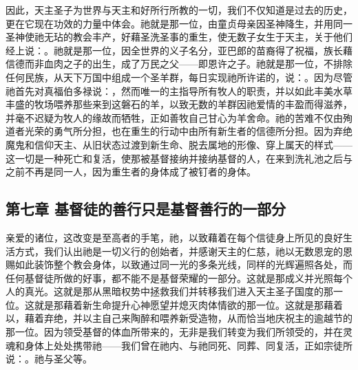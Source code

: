 因此，天主圣子为世界与天主和好所行所教的一切，我们不仅知道是过去的历史，更在它现在功效的力量中体会。祂就是那一位，由童贞母亲因圣神降生，并用同一圣神使祂无玷的教会丰产，好藉圣洗圣事的重生，使无数子女生于天主，关于他们经上说：。祂就是那一位，因全世界的义子名分，亚巴郎的苗裔得了祝福，族长藉信德而非血肉之子的出生，成了万民之父——即恩许之子。祂就是那一位，不排除任何民族，从天下万国中组成一个圣羊群，每日实现祂所许诺的，说：。因为尽管祂首先对真福伯多禄说：，然而唯一的主指导所有牧人的职责，并以如此丰美水草丰盛的牧场喂养那些来到这磐石的羊，以致无数的羊群因祂爱情的丰盈而得滋养，并毫不迟疑为牧人的缘故而牺牲，正如善牧自己甘心为羊舍命。祂的苦难不仅由殉道者光荣的勇气所分担，也在重生的行动中由所有新生者的信德所分担。因为弃绝魔鬼和信仰天主、从旧状态过渡到新生命、脱去属地的形像、穿上属天的样式——这一切是一种死亡和复活，使那被基督接纳并接纳基督的人，在来到洗礼池之后与之前不再是同一人，因为重生者的身体成了被钉者的身体。\par


\subsection{第七章 基督徒的善行只是基督善行的一部分}

亲爱的诸位，这改变是至高者的手笔，祂，以致藉着在每个信徒身上所见的良好生活方式，我们认出祂是一切义行的创始者，并感谢天主的仁慈，祂以无数恩宠的恩赐如此装饰整个教会身体，以致通过同一光的多条光线，同样的光辉遍照各处，而任何基督徒所做的好事，都不能不是基督荣耀的一部分。这就是那成义并光照每个人的真光。这就是那从黑暗权势中拯救我们并转移我们进入天主圣子国度的那一位。这就是那藉着新生命提升心神愿望并熄灭肉体情欲的那一位。这就是那藉着以，藉着弃绝，并以主自己来陶醉和喂养新受造物，从而恰当地庆祝主的逾越节的那一位。因为领受基督的体血所带来的，无非是我们转变为我们所领受的，并在灵魂和身体上处处携带祂——我们曾在祂内、与祂同死、同葬、同复活，正如宗徒所说：。祂与圣父等。\par


